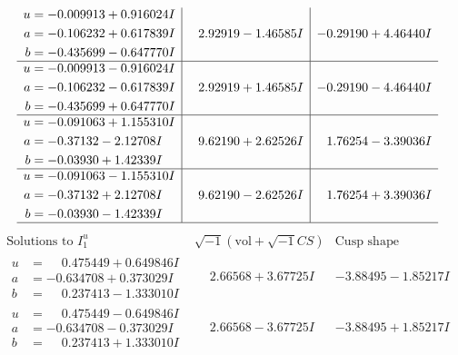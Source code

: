 \documentclass[1p]{elsarticle_modified}
\theoremstyle{definition}
\newcommand{\I}{\sqrt{-1}}
\begin{document}
$$\begin{array}{c|c|c}
\begin{aligned}
u &= -0.009913 + 0.916024 I \\
a &= -0.106232 + 0.617839 I \\
b &= -0.435699 - 0.647770 I\end{aligned}
 & \phantom{-}2.92919 - 1.46585 I & -0.29190 + 4.46440 I \\ \hline\begin{aligned}
u &= -0.009913 - 0.916024 I \\
a &= -0.106232 - 0.617839 I \\
b &= -0.435699 + 0.647770 I\end{aligned}
 & \phantom{-}2.92919 + 1.46585 I & -0.29190 - 4.46440 I \\ \hline\begin{aligned}
u &= -0.091063 + 1.155310 I \\
a &= -0.37132 - 2.12708 I \\
b &= -0.03930 + 1.42339 I\end{aligned}
 & \phantom{-}9.62190 + 2.62526 I & \phantom{-}1.76254 - 3.39036 I \\ \hline\begin{aligned}
u &= -0.091063 - 1.155310 I \\
a &= -0.37132 + 2.12708 I \\
b &= -0.03930 - 1.42339 I\end{aligned}
 & \phantom{-}9.62190 - 2.62526 I & \phantom{-}1.76254 + 3.39036 I\\
 \hline 
 \end{array}$$\newpage$$\begin{array}{c|c|c}  
\text{Solutions to }I^u_{1}& \I (\text{vol} + \sqrt{-1}CS) & \text{Cusp shape}\\
 \hline 
\begin{aligned}
u &= \phantom{-}0.475449 + 0.649846 I \\
a &= -0.634708 + 0.373029 I \\
b &= \phantom{-}0.237413 - 1.333010 I\end{aligned}
 & \phantom{-}2.66568 + 3.67725 I & -3.88495 - 1.85217 I \\ \hline\begin{aligned}
u &= \phantom{-}0.475449 - 0.649846 I \\
a &= -0.634708 - 0.373029 I \\
b &= \phantom{-}0.237413 + 1.333010 I\end{aligned}
 & \phantom{-}2.66568 - 3.67725 I & -3.88495 + 1.85217 I \\ \hline\begin{aligned}

\end{aligned}
\end{array}$$
\end{document}
